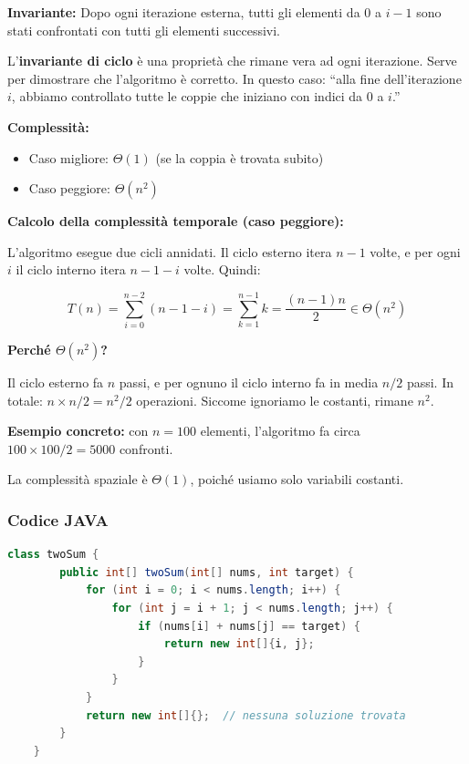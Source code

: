 \noindent\textbf{Invariante:} Dopo ogni iterazione esterna, tutti gli elementi da $0$ a $i-1$ sono stati confrontati con tutti gli elementi successivi.

\begin{nota}
	L'\textbf{invariante di ciclo} è una proprietà che rimane vera ad ogni iterazione. Serve per dimostrare che l'algoritmo è corretto. In questo caso: ``alla fine dell'iterazione $i$, abbiamo controllato tutte le coppie che iniziano con indici da $0$ a $i$.''
\end{nota}

\noindent\textbf{Complessità:}
\begin{itemize}
	\item Caso migliore: $\Theta(1)$ (se la coppia è trovata subito)
	\item Caso peggiore: $\Theta(n^2)$
\end{itemize}

\noindent\textbf{Calcolo della complessità temporale (caso peggiore):}

L'algoritmo esegue due cicli annidati. Il ciclo esterno itera $n-1$ volte, e per ogni $i$ il ciclo interno itera $n-1-i$ volte. Quindi:

\[
T(n) = \sum_{i=0}^{n-2} (n-1-i) = \sum_{k=1}^{n-1} k = 	\frac{(n-1)n}{2} \in \Theta(n^2)
\]

\begin{softnote}
	\textbf{Perché $\Theta(n^2)$?}
	
	Il ciclo esterno fa $n$ passi, e per ognuno il ciclo interno fa in media $n/2$ passi. In totale: $n \times n/2 = n^2/2$ operazioni. Siccome ignoriamo le costanti, rimane $n^2$.
	
	\textbf{Esempio concreto:} con $n=100$ elementi, l'algoritmo fa circa $100 \times 100 / 2 = 5000$ confronti.
\end{softnote}

La complessità spaziale è $\Theta(1)$, poiché usiamo solo variabili costanti. 

\subsubsection*{Codice JAVA}
\begin{lstlisting}[language=Java, numbers=none, basicstyle=\ttfamily\footnotesize]
	class twoSum {
		public int[] twoSum(int[] nums, int target) {
			for (int i = 0; i < nums.length; i++) {
				for (int j = i + 1; j < nums.length; j++) {
					if (nums[i] + nums[j] == target) {
						return new int[]{i, j};
					}
				}
			}
			return new int[]{};  // nessuna soluzione trovata
		}
	}
\end{lstlisting}

